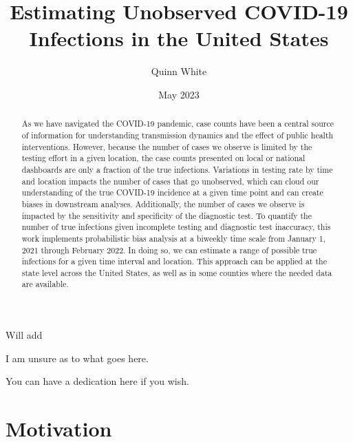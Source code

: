 \documentclass[12pt,twoside]{smiththesis}
\title{Estimating Unobserved COVID-19 Infections in the United States}
\author{Quinn White}
\date{May 2023}
\begin{document}
  \maketitle

\frontmatter %
\pagestyle{empty} %
  \begin{acknowledgements}
    Will add
  \end{acknowledgements}
  \begin{preface}
    I am unsure as to what goes here.
  \end{preface}
  \hypersetup{linkcolor=black}
  \setcounter{tocdepth}{2}
  \tableofcontents

  \listoftables

  \listoffigures
  \begin{abstract}
    As we have navigated the COVID-19 pandemic, case counts have been a central source of information for understanding transmission dynamics and the effect of public health interventions. However, because the number of cases we observe is limited by the testing effort in a given location, the case counts presented on local or national dashboards are only a fraction of the true infections. Variations in testing rate by time and location impacts the number of cases that go unobserved, which can cloud our understanding of the true COVID-19 incidence at a given time point and can create biases in downstream analyses. Additionally, the number of cases we observe is impacted by the sensitivity and specificity of the diagnostic test. To quantify the number of true infections given incomplete testing and diagnostic test inaccuracy, this work implements probabilistic bias analysis at a biweekly time scale from January 1, 2021 through February 2022. In doing so, we can estimate a range of possible true infections for a given time interval and location. This approach can be applied at the state level across the United States, as well as in some counties where the needed data are available.
  \end{abstract}
  \begin{dedication}
    You can have a dedication here if you wish.
  \end{dedication}
\mainmatter %
\pagestyle{fancyplain} %

\hypertarget{motivation}{%
\chapter{Motivation}\label{motivation}}
\end{document}
